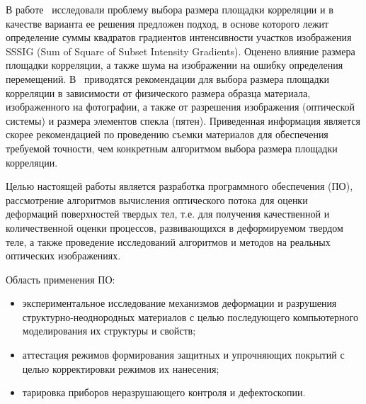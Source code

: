 В работе~\cite{pan_intro_four} исследовали проблему выбора размера площадки корреляции и в качестве варианта ее решения предложен подход, в основе которого лежит определение суммы квадратов градиентов интенсивности участков изображения {SSSIG} (Sum of Square of Subset Intensity Gradients). Оценено влияние размера площадки корреляции, а также шума на изображении на ошибку определения перемещений. В~\cite{pan_intro_one} приводятся рекомендации для выбора размера площадки корреляции в зависимости от физического размера образца материала, изображенного на фотографии, а также от разрешения изображения (оптической системы) и размера элементов спекла (пятен). Приведенная информация является скорее рекомендацией по проведению съемки материалов для обеспечения требуемой точности, чем конкретным алгоритмом выбора размера площадки корреляции.

Целью настоящей работы является разработка программного обеспечения (ПО), рассмотрение алгоритмов вычисления оптического потока для оценки деформаций поверхностей твердых тел, т.е. для получения качественной и количественной оценки процессов, развивающихся в деформируемом твердом теле, а также проведение исследований алгоритмов и методов на реальных оптических изображениях.

Область применения ПО:
\begin{itemize}
\item экспериментальное исследование механизмов деформации и разрушения структурно-неоднородных материалов с целью последующего компьютерного моделирования их структуры и свойств;
\item аттестация режимов формирования защитных и упрочняющих покрытий с целью корректировки режимов их нанесения;
\item тарировка приборов неразрушающего контроля и дефектоскопии.
\end{itemize}


